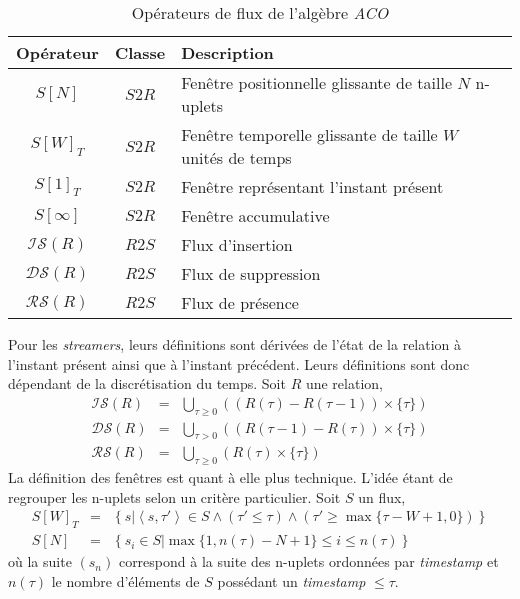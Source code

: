 \begin{table}[ht]
 \centering
\begin{tabular}{|c|c|l|}\bottomrule
Opérateur & Classe & Description \\\toprule \bottomrule
$S[N]$ & $S2R$ & Fenêtre positionnelle glissante de taille $N$ n-uplets \\ \hline
$S[W]_T$ & $S2R$ & Fenêtre temporelle glissante de taille $W$ unités de temps \\\hline
$S[1]_T$ & $S2R$ & Fenêtre représentant l'instant présent\\\hline
$S[\infty]$ & $S2R$ & Fenêtre accumulative\\ \toprule \bottomrule
$\mathcal{IS}(R)$ & $R2S$ & Flux d'insertion \\ \hline
$\mathcal{DS}(R)$ & $R2S$ & Flux de suppression \\ \hline
$\mathcal{RS}(R)$ & $R2S$ & Flux de présence \\ \toprule
\end{tabular}
\caption{Opérateurs de flux de l'algèbre \textit{ACO}}\label{tab:rw:sgfd:acostream}
\end{table}

Pour les \textit{streamers}, leurs définitions sont dérivées de l'état de la relation à l'instant présent ainsi que à l'instant précédent. Leurs définitions sont donc dépendant de la discrétisation du temps. Soit $R$ une relation, 
\begin{eqnarray*}
    \mathcal{IS}(R) & = & \bigcup_{\tau\geq 0} ((R(\tau) - R(\tau-1))\times \{\tau\})\\
    \mathcal{DS}(R) & = & \bigcup_{\tau>0} ((R(\tau-1) - R(\tau))\times \{\tau\})\\
    \mathcal{RS}(R) & = & \bigcup_{\tau\geq 0} (R(\tau)\times \{\tau\})
\end{eqnarray*}
La définition des fenêtres est quant à elle plus technique. L'idée étant de regrouper les n-uplets selon un critère particulier. Soit $S$ un flux,
\begin{eqnarray*}
    S[W]_T & = & \left\{s | \left<s,\tau'\right>\in S \wedge (\tau' \leq \tau) \wedge (\tau' \geq \max\{\tau - W +1,0\})   \right\}\\
    S[N] & = & \left\{s_i \in S | \max\{1,n(\tau)-N+1\} \leq i \leq n(\tau)\right\}
\end{eqnarray*}
où la suite $(s_n)$ correspond à la suite des n-uplets ordonnées par \textit{timestamp} et $n(\tau)$ le nombre d'éléments de $S$ possédant un \textit{timestamp} $\leq \tau$.

